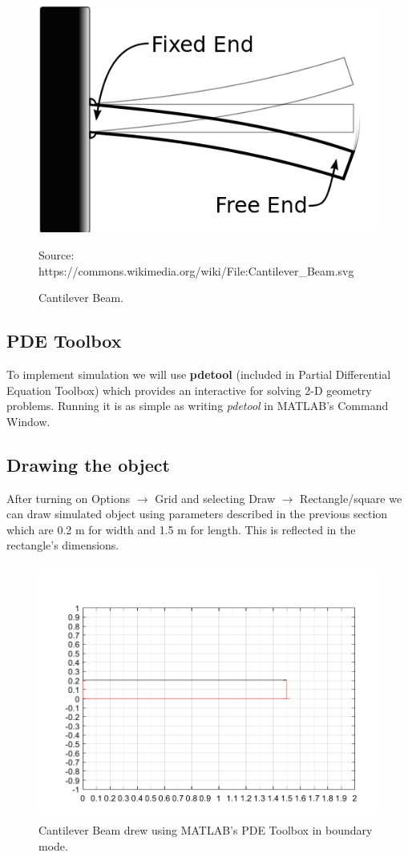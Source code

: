 \documentclass[12pt]{article}
\newcommand{\source}[1]{\caption*{Source: {#1}} }
\begin{document}
\begin{figure}[H]
	\centering
	\includegraphics[width=\textwidth]{2}
	\caption{Cantilever Beam.}
	\source{https://commons.wikimedia.org/wiki/File:Cantilever\_Beam.svg}
	\label{2}
\end{figure}
 
\subsection{PDE Toolbox}
To implement simulation we will use \textbf{pdetool} (included in Partial Differential Equation Toolbox) which provides an interactive for solving 2-D geometry problems. Running it is as simple as writing \textit{pdetool} in MATLAB's Command Window.

\subsection{Drawing the object}

After turning on Options $\rightarrow$ Grid and selecting Draw $\rightarrow$ Rectangle/square we can draw simulated object using parameters described in the previous section which are 0.2 m for width and 1.5 m for length. This is reflected in the rectangle's dimensions.

\begin{figure}[H]
	\centering
	\includegraphics[width=\textwidth]{1}
	\caption{Cantilever Beam drew using MATLAB's PDE Toolbox in boundary mode.}
	\label{1}
\end{figure}
\end{document}
